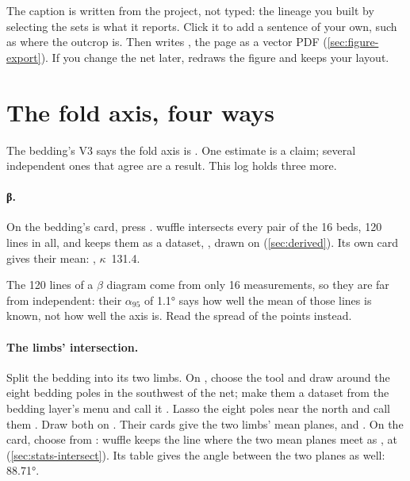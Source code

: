 The caption is written from the project, not typed: the lineage you built by selecting the sets is what
it reports. Click it to add a sentence of your own, such as where the outcrop is. Then
 writes , the page as a vector PDF (\cref{sec:figure-export}). If
you change the net later,  redraws the figure and keeps your layout.

\section{The fold axis, four ways}\label{sec:wf-axis}

The bedding's V3 says the fold axis is . One estimate is a claim; several independent ones
that agree are a result. This log holds three more.

\paragraph{β.} On the bedding's card, press . wuffle intersects every pair of the 16
beds, 120 lines in all, and keeps them as a dataset, , drawn on 
(\cref{sec:derived}). Its own card gives their mean: , $\kappa$~131.4.

\begin{note}
The 120 lines of a $\beta$ diagram come from only 16 measurements, so they are far from independent:
their $\alpha_{95}$ of 1.1° says how well the mean of those lines is known, not how well the axis is.
Read the spread of the points instead.
\end{note}

\paragraph{The limbs' intersection.} Split the bedding into its two limbs. On , choose the
 tool and draw around the eight bedding poles in the southwest of the net; make them a
dataset from the bedding layer's menu and call it . Lasso the eight poles near the north
and call them . Draw both on . Their cards give the two limbs' mean planes,
 and . On the  card, choose  from : wuffle keeps the line where the two mean planes meet as , at
 (\cref{sec:stats-intersect}). Its table gives the angle between the two planes as well:
88.71°.

